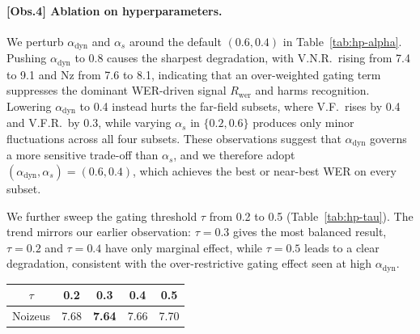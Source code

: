 \documentclass{article}
\begin{document}
\vspace{-2mm}
\paragraph{\textbf{[Obs.4] Ablation on hyperparameters.}}
We perturb $\alpha_{\text{dyn}}$ and $\alpha_s$ around the default $(0.6, 0.4)$ in Table~\ref{tab:hp-alpha}. Pushing $\alpha_{\text{dyn}}$ to 0.8 causes the sharpest degradation, with V.N.R.\ rising from 7.4 to 9.1 and Nz from 7.6 to 8.1, indicating that an over-weighted gating term suppresses the dominant WER-driven signal $R_{\text{wer}}$ and harms recognition. Lowering $\alpha_{\text{dyn}}$ to 0.4 instead hurts the far-field subsets, where V.F.\ rises by 0.4 and V.F.R.\ by 0.3, while varying $\alpha_s$ in $\{0.2, 0.6\}$ produces only minor fluctuations across all four subsets. These observations suggest that $\alpha_{\text{dyn}}$ governs a more sensitive trade-off than $\alpha_s$, and we therefore adopt $(\alpha_{\text{dyn}}, \alpha_s){=}(0.6, 0.4)$, which achieves the best or near-best WER on every subset.

\vspace{-2mm}
\begin{minipage}[c]{0.55\textwidth}
We further sweep the gating threshold $\tau$ from 0.2 to 0.5 (Table~\ref{tab:hp-tau}). The trend mirrors our earlier observation: $\tau{=}0.3$ gives the most balanced result, $\tau{=}0.2$ and $\tau{=}0.4$ have only marginal effect, while $\tau{=}0.5$ leads to a clear degradation, consistent with the over-restrictive gating effect seen at high $\alpha_{\text{dyn}}$.
\end{minipage}%
\hfill
\begin{minipage}[c]{0.42\textwidth}
\centering
\vspace{-2mm}
\label{tab:hp-tau}
\small
\setlength{\tabcolsep}{6pt}
\begin{tabular}{ccccc}
\toprule
$\tau$ & 0.2 & \textbf{0.3} & 0.4 & 0.5 \\
\midrule
Noizeus & 7.68 & \textbf{7.64} & 7.66 & 7.70 \\
\bottomrule
\end{tabular}
\end{minipage}


\end{document}
